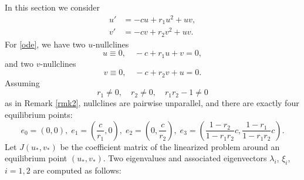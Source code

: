 \documentclass{amsart}
\theoremstyle{definition}
\numberwithin{equation}{section}
\begin{document}
In this section we consider 
\begin{equation}\label{ode}
\begin{aligned}
{u}' &= -c{u} + r_{1}{u}^{2} + {u}  {v},   \\
{v}' &=-c{v} + r_{2}{v}^{2} + {u}  {v}.
\end{aligned}
\end{equation}
For \eqref{ode}, we have two $u$-nullclines 
$$u\equiv0, \quad -c + r_1 u + v = 0,$$
and two $v$-nullclines 
$$v\equiv0, \quad -c + r_2 v + u = 0.$$
Assuming 
\begin{equation} \label{notborderline}
 r_1 \ne 0, \quad r_2\ne0, \quad r_1r_2-1 \ne 0
\end{equation}
as in Remark \ref{rmk2}, nullclines are pairwise unparallel, and there are exactly four equilibrium points:
\begin{equation*}
e_{0} = (0,0), \; e_{1} = \left( \frac{c}{r_{1}}, 0 \right), \;
e_{2} = \left( 0, \frac{c}{r_{2}} \right), \;
e_{3}= \left( \frac{1-r_{2}}{1-r_{1}r_{2}}c,
\frac{1-r_{1}}{1-r_{1}r_{2}}c\right) .
\end{equation*}
Let $J(u_*,v_*)$ be the coefficient matrix of the linearized problem around an equilibrium point $(u_*,v_*)$. Two eigenvalues and associated eigenvectors $\lambda_i$, $\xi_i$, $i=1,2$ are computed as follows:
\end{document}
